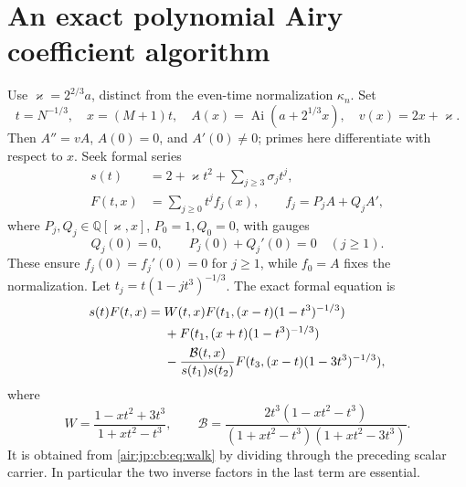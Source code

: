 \documentclass[11pt,letterpaper]{article}
\numberwithin{equation}{section}
\theoremstyle{remark}
\newcommand{\Ai}{\operatorname{Ai}}
\newcommand{\Q}{\mathbb{Q}}
\begin{document}
\section{An exact polynomial Airy coefficient algorithm}\label{air:jp:cb:sec:formal}
Use $\varkappa=2^{2/3}a$, distinct from the even-time normalization $\kappa_n$. Set
\[
 t=N^{-1/3},\quad x=(M+1)t,\quad A(x)=\Ai(a+2^{1/3}x),\quad v(x)=2x+\varkappa.
\]
Then $A''=vA$, $A(0)=0$, and $A'(0)\ne0$; primes here differentiate with respect to $x$.
Seek formal series
\begin{align}
 s(t)&=2+\varkappa t^2+\sum_{j\ge3}\sigma_jt^j,\label{air:jp:cb:eq:formals}\\
 F(t,x)&=\sum_{j\ge0}t^jf_j(x),\qquad f_j=P_jA+Q_jA',\label{air:jp:cb:eq:formalF}
\end{align}
where $P_j,Q_j\in\Q[\varkappa,x]$, $P_0=1,Q_0=0$, with gauges
\begin{equation}\label{air:jp:cb:eq:formalgauge}
 Q_j(0)=0,\qquad P_j(0)+Q_j'(0)=0\quad(j\ge1).
\end{equation}
These ensure $f_j(0)=f_j'(0)=0$ for $j\ge1$, while $f_0=A$ fixes the normalization.
Let $t_j=t(1-jt^3)^{-1/3}$. The exact formal equation is
\begin{align}
 s(t)F(t,x)={}&W(t,x)F(t_1,(x-t)(1-t^3)^{-1/3})\notag\\
 &+F(t_1,(x+t)(1-t^3)^{-1/3})\notag\\
 &-\frac{\mathcal B(t,x)}{s(t_1)s(t_2)}
 F(t_3,(x-t)(1-3t^3)^{-1/3}),\label{air:jp:cb:eq:formalrec}
\end{align}
where
\[
 W=\frac{1-xt^2+3t^3}{1+xt^2-t^3},\qquad
 \mathcal B=\frac{2t^3(1-xt^2-t^3)}{(1+xt^2-t^3)(1+xt^2-3t^3)}.
\]
It is obtained from \eqref{air:jp:cb:eq:walk} by dividing through the preceding scalar carrier. In particular the two inverse factors in the last term are essential.
\end{document}
